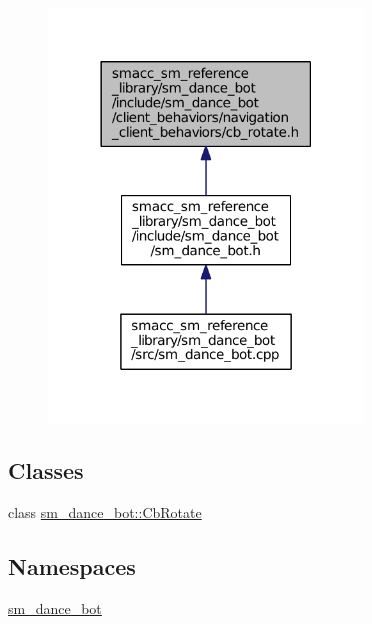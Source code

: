 \begin{figure}[H]
\begin{center}
\leavevmode
\includegraphics[width=237pt]{smacc__sm__reference__library_2sm__dance__bot_2include_2sm__dance__bot_2client__behaviors_2navigf26327dac7bca7bfaf5deb61f3b9dd78}
\end{center}
\end{figure}
\subsection*{Classes}
\begin{DoxyCompactItemize}
\item 
class \hyperlink{classsm__dance__bot_1_1CbRotate}{sm\+\_\+dance\+\_\+bot\+::\+Cb\+Rotate}
\end{DoxyCompactItemize}
\subsection*{Namespaces}
\begin{DoxyCompactItemize}
\item 
 \hyperlink{namespacesm__dance__bot}{sm\+\_\+dance\+\_\+bot}
\end{DoxyCompactItemize}
